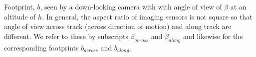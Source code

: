 \label{fig:fov} Footprint, $b$, seen by a down-looking camera with with angle of view of $\beta$ at an altitude of $h$. In general, the aspect ratio of imaging sensors is not square so that angle of view across track (across direction of motion) and along track are different. We refer to these by subscripts $\beta_{across}$ and $\beta_{along}$ and likewise for the corresponding footprints $b_{across}$ and $b_{along}$.